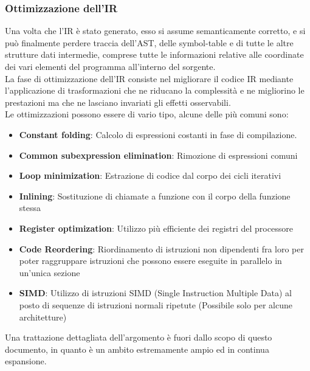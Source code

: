 \subsubsection{Ottimizzazione dell'IR}
Una volta che l'IR è stato generato, esso si assume semanticamente corretto, e si può finalmente perdere traccia 
dell'AST, delle symbol-table e di tutte le altre strutture dati intermedie, comprese tutte le informazioni relative 
alle coordinate dei vari elementi del programma all'interno del sorgente. \\


La fase di ottimizzazione dell'IR consiste nel migliorare il codice IR mediante l'applicazione di trasformazioni
che ne riducano la complessità e ne migliorino le prestazioni ma che ne lasciano invariati gli effetti osservabili. \\

Le ottimizzazioni possono essere di vario tipo, alcune delle più comuni sono:

\begin{itemize}
    \item \textbf{Constant folding}: Calcolo di espressioni costanti in fase di compilazione.
    
    \item \textbf{Common subexpression elimination}: Rimozione di espressioni comuni
    
    \item \textbf{Loop minimization}: Estrazione di codice dal corpo dei cicli iterativi
    
    \item \textbf{Inlining}: Sostituzione di chiamate a funzione con il corpo della funzione stessa
    
    \item \textbf{Register optimization}: Utilizzo più efficiente dei registri del processore

    \item \textbf{Code Reordering}: Riordinamento di istruzioni non dipendenti fra loro per
    poter raggruppare istruzioni che possono essere eseguite in parallelo in un'unica sezione
    
    \item \textbf{SIMD}: Utilizzo di istruzioni SIMD (Single Instruction Multiple Data) al 
    posto di sequenze di istruzioni normali ripetute (Possibile solo per alcune architetture) 
\end{itemize}

Una trattazione dettagliata dell'argomento è fuori dallo scopo di questo documento, in quanto è un 
ambito estremamente ampio ed in continua espansione. \\
